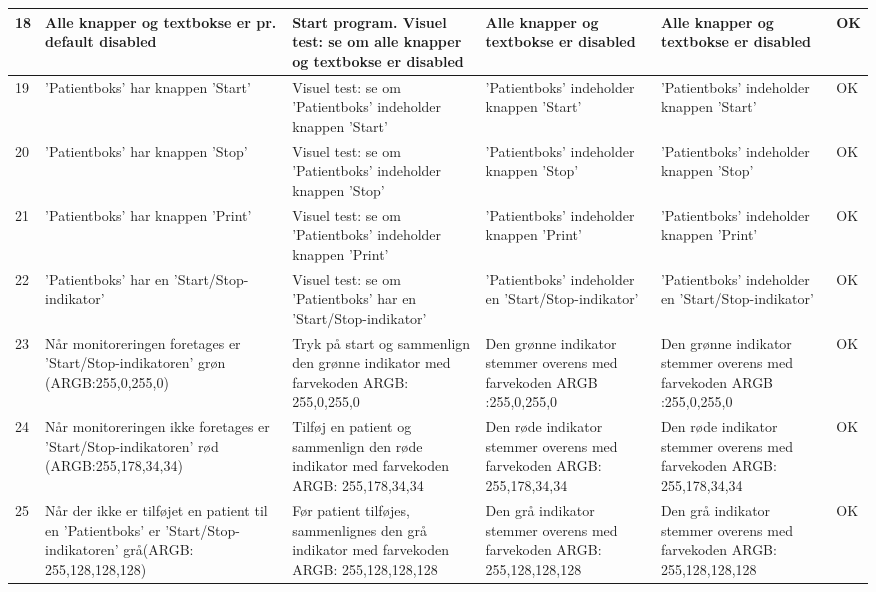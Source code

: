 \begin{table}[H]
\begin{tabular}{|p{0.5cm}|p{4cm}|p{3cm}|p{3cm}|p{3cm}|p{1cm}|}
\hline
 18 & Alle knapper og textbokse er pr. default disabled & Start program. Visuel test: se om alle knapper og textbokse er disabled & Alle knapper og textbokse er disabled & Alle knapper og textbokse er disabled & OK \\\hline
 19 & 'Patientboks' har knappen 'Start' & Visuel test: se om 'Patientboks' indeholder knappen 'Start' & 'Patientboks' indeholder knappen 'Start' & 'Patientboks' indeholder knappen 'Start' & OK \\\hline
 20 & 'Patientboks' har knappen 'Stop' & Visuel test: se om 'Patientboks' indeholder knappen 'Stop' & 'Patientboks' indeholder knappen 'Stop' & 'Patientboks' indeholder knappen 'Stop'  & OK \\\hline
 21 & 'Patientboks' har knappen 'Print' & Visuel test: se om 'Patientboks' indeholder knappen 'Print' & 'Patientboks' indeholder knappen 'Print' & 'Patientboks' indeholder knappen 'Print' & OK \\\hline
 22 & 'Patientboks' har en 'Start/Stop-indikator' & Visuel test: se om 'Patientboks' har en 'Start/Stop-indikator' & 'Patientboks' indeholder en 'Start/Stop-indikator' & 'Patientboks' indeholder en 'Start/Stop-indikator' & OK \\\hline
  23 & Når monitoreringen foretages er 'Start/Stop-indikatoren' grøn (ARGB:255,0,255,0) & Tryk på start og sammenlign den grønne indikator med farvekoden ARGB: 255,0,255,0 & Den grønne indikator stemmer overens med farvekoden ARGB :255,0,255,0 & Den grønne indikator stemmer overens med farvekoden ARGB :255,0,255,0 & OK \\\hline
 24 & Når monitoreringen ikke foretages er 'Start/Stop-indikatoren' rød (ARGB:255,178,34,34) & Tilføj en patient og sammenlign den røde indikator med farvekoden ARGB: 255,178,34,34 & Den røde indikator stemmer overens med farvekoden ARGB: 255,178,34,34 &  Den røde indikator stemmer overens med farvekoden ARGB: 255,178,34,34 & OK \\\hline
25 & Når der ikke er tilføjet en patient til en 'Patientboks' er 'Start/Stop-indikatoren' grå(ARGB: 255,128,128,128) & Før patient tilføjes, sammenlignes  den grå indikator med farvekoden ARGB: 255,128,128,128 & Den grå indikator stemmer overens med farvekoden ARGB: 255,128,128,128 & Den grå indikator stemmer overens med farvekoden ARGB: 255,128,128,128 & OK \\\hline
 \end{tabular}
\end{table}

